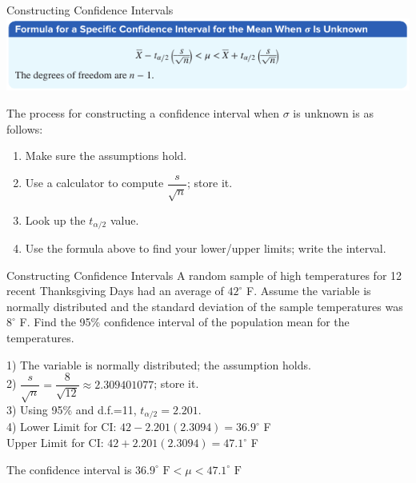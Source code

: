 \documentclass[t, aspectratio=169]{beamer}
\def\dg{^{\circ}}
\newcommand{\?}{\stackrel{?}{=}}
\begin{document}
	\begin{frame}{Constructing Confidence Intervals}
		\includegraphics[width=\textwidth]{conf-form.png} \pause
		
		The process for constructing a confidence interval when $\sigma$ is unknown is as follows: \pause \begin{enumerate}[1)]
			\item Make sure the assumptions hold. \pause
			\item Use a calculator to compute $\dfrac{s}{\sqrt{n}}$; store it. \pause
			\item Look up the $t_{\alpha / 2}$ value. \pause
			\item Use the formula above to find your lower/upper limits; write the interval.
		\end{enumerate}
	\end{frame}

	\begin{frame}{Constructing Confidence Intervals}
		A random sample of high temperatures for 12 recent Thanksgiving Days had an average of $42\dg$ F. Assume the variable is normally distributed and the standard deviation of the sample temperatures was $8\dg$ F. Find the 95\% confidence interval of the population mean for the temperatures. \pause
		
		1) The variable is normally distributed; the assumption holds. \pause \\
		2) $\dfrac{s}{\sqrt{n}} = \dfrac{8}{\sqrt{12}} \approx 2.309401077$; store it. \pause \\
		3) Using 95\% and d.f.=11, $t_{\alpha/2} = 2.201$. \pause \\
		
		4) Lower Limit for CI: $42 - 2.201(2.3094) = 36.9\dg$ F \pause \\
		Upper Limit for CI: $42 + 2.201(2.3094) = 47.1\dg$ F \pause
		
		The confidence interval is $36.9\dg\text{ F} < \mu < 47.1\dg\text{ F}$
	\end{frame}
\end{document}
